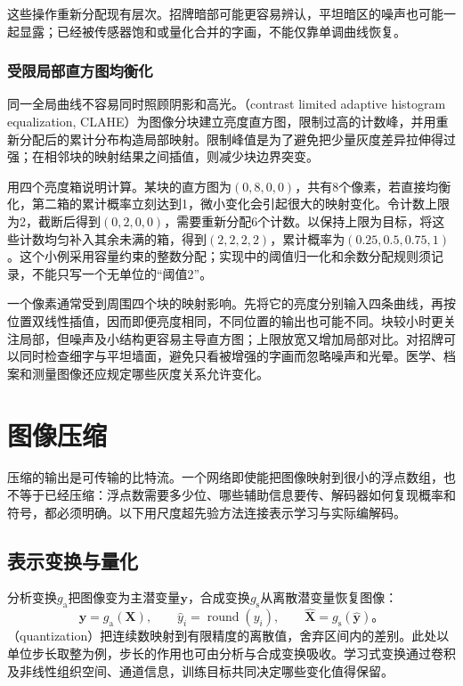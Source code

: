 这些操作重新分配现有层次。招牌暗部可能更容易辨认，平坦暗区的噪声也可能一起显露；已经被传感器饱和或量化合并的字画，不能仅靠单调曲线恢复。

\subsubsection{受限局部直方图均衡化}
\label{sec:vision-restoration-clahe}

同一全局曲线不容易同时照顾阴影和高光。（contrast limited adaptive histogram equalization, CLAHE）为图像分块建立亮度直方图，限制过高的计数峰，并用重新分配后的累计分布构造局部映射。限制峰值是为了避免把少量灰度差异拉伸得过强；在相邻块的映射结果之间插值，则减少块边界突变。

用四个亮度箱说明计算。某块的直方图为$(0,8,0,0)$，共有8个像素，若直接均衡化，第二箱的累计概率立刻达到1，微小变化会引起很大的映射变化。令计数上限为2，截断后得到$(0,2,0,0)$，需要重新分配6个计数。以保持上限为目标，将这些计数均匀补入其余未满的箱，得到$(2,2,2,2)$，累计概率为$(0.25,0.5,0.75,1)$。这个小例采用容量约束的整数分配；实现中的阈值归一化和余数分配规则须记录，不能只写一个无单位的“阈值2”。

一个像素通常受到周围四个块的映射影响。先将它的亮度分别输入四条曲线，再按位置双线性插值，因而即便亮度相同，不同位置的输出也可能不同。块较小时更关注局部，但噪声及小结构更容易主导直方图；上限放宽又增加局部对比。对招牌可以同时检查细字与平坦墙面，避免只看被增强的字画而忽略噪声和光晕。医学、档案和测量图像还应规定哪些灰度关系允许变化。

\section{图像压缩}
\label{sec:vision-restoration-compression}

压缩的输出是可传输的比特流。一个网络即使能把图像映射到很小的浮点数组，也不等于已经压缩：浮点数需要多少位、哪些辅助信息要传、解码器如何复现概率和符号，都必须明确。以下用尺度超先验方法连接表示学习与实际编解码。

\subsection{表示变换与量化}
\label{sec:vision-restoration-quantization}

分析变换$g_{\mathrm{a}}$把图像变为主潜变量$\bm{y}$，合成变换$g_{\mathrm{s}}$从离散潜变量恢复图像：
\begin{equation}
 \bm{y}=g_{\mathrm{a}}(\bm{X}),\qquad
 \hat y_i=\operatorname{round}(y_i),\qquad
 \widehat{\bm{X}}=g_{\mathrm{s}}(\hat{\bm{y}})\text{。}
 \label{eq:vision-transform-coding}
\end{equation}
（quantization）把连续数映射到有限精度的离散值，舍弃区间内的差别。此处以单位步长取整为例，步长的作用也可由分析与合成变换吸收。学习式变换通过卷积及非线性组织空间、通道信息，训练目标共同决定哪些变化值得保留。

